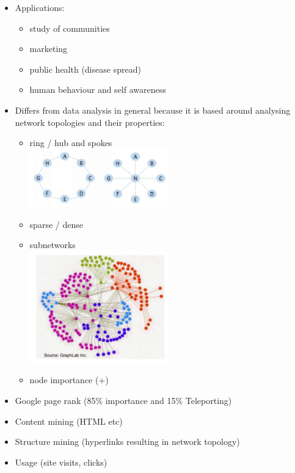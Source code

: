 \newpage


\begin{itemize}
\item Applications:
  \begin{itemize}
  \item study of communities 
  \item marketing
  \item public health (disease spread)
  \item human behaviour and self awareness
  \end{itemize}
\item Differs from data analysis in general because it is based around analysing network topologies and their properties:
  \begin{itemize}
  \item ring / hub and spokes \\
    \includegraphics[width=0.5\textwidth]{hub_spoke.png}
  \item sparse / dense
  \item subnetworks\\
    \includegraphics[width=0.5\textwidth]{subnet.png}
  \item node importance (+)
  \end{itemize}
  \item Google page rank (85\% importance and 15\% Teleporting)
\end{itemize}
\newpage

\begin{itemize}
\item Content mining (HTML etc)
\item Structure mining (hyperlinks resulting in network topology)
\item Usage (site visits, clicks)
\end{itemize}
\newpage




